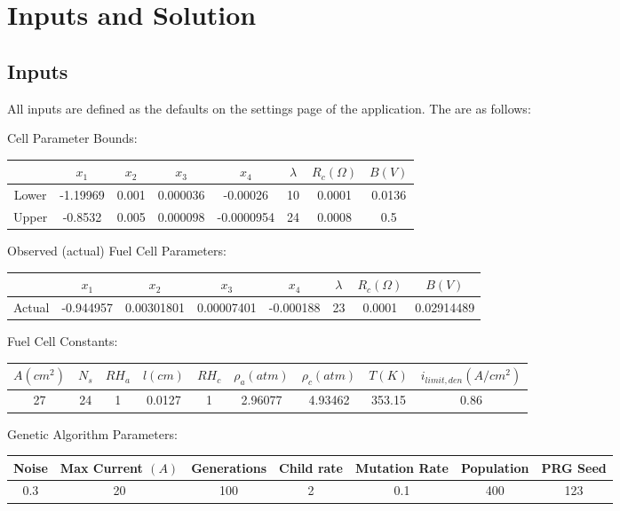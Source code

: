 \documentclass{article}
\begin{document}
\section{Inputs and Solution}

\subsection{Inputs}

All inputs are defined as the defaults on the settings page of the application. The are as follows:

Cell Parameter Bounds:
\begin{center}
\begin{tabular}{|c | c | c | c | c | c | c | c|} 
\hline
& $x_1$ & $x_2$ & $x_3$ & $x_4$ & $\lambda$ & $R_c (\Omega)$ & $B (V)$ \\ 
\hline
Lower & -1.19969 & 0.001 & 0.000036 & -0.00026 & 10 & 0.0001 & 0.0136 \\ 
\hline
Upper & -0.8532 & 0.005 & 0.000098 & -0.0000954 & 24 & 0.0008 & 0.5 \\ 
\hline
\end{tabular}
\end{center}

Observed (actual) Fuel Cell Parameters:
\begin{center}
\begin{tabular}{|c | c | c | c | c | c | c | c|} 
\hline
& $x_1$ & $x_2$ & $x_3$ & $x_4$ & $\lambda$ & $R_c (\Omega)$ & $B (V)$ \\ 
\hline
Actual & -0.944957 & 0.00301801 & 0.00007401 & -0.000188 & 23 & 0.0001 & 0.02914489 \\ 
\hline
\end{tabular}
\end{center}

Fuel Cell Constants:
\begin{center}
\begin{tabular}{| c | c | c | c | c | c | c | c | c |} 
\hline
$A (cm^2)$ & $N_s$ & $RH_a$ & $l (cm)$ & $RH_c$ & $\rho_a (atm)$ & $\rho_c (atm)$ & $T (K)$ & $i_{limit,den} (A/cm^2)$ \\ 
\hline
27 & 24 & 1 & 0.0127 & 1 & 2.96077 & 4.93462 & 353.15 & 0.86 \\ 
\hline
\end{tabular}
\end{center}

Genetic Algorithm Parameters:
\begin{center}
\begin{tabular}{| c | c | c | c | c | c | c |} 
\hline
Noise & Max Current $(A)$ & Generations & Child rate & Mutation Rate & Population & PRG Seed \\ 
\hline
0.3 & 20 & 100 & 2 & 0.1 & 400 & 123 \\ 
\hline
\end{tabular}
\end{center}
\end{document}
